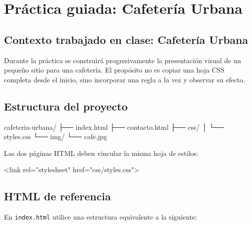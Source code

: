 \documentclass[11pt]{article}
\begin{document}
    \section{Práctica guiada: Cafetería Urbana}

    \subsection{Contexto trabajado en clase: Cafetería Urbana}

    Durante la práctica se construirá progresivamente la presentación visual de un pequeño sitio para una cafetería. El propósito no es copiar una hoja CSS completa desde el inicio, sino incorporar una regla a la vez y observar su efecto.

    \subsection{Estructura del proyecto}

    \begin{bashcodedark}
        cafeteria-urbana/
        ├── index.html
        ├── contacto.html
        ├── css/
        │   └── styles.css
        └── img/
            └── cafe.jpg
    \end{bashcodedark}

    Las dos páginas HTML deben vincular la misma hoja de estilos:

    \begin{htmlcodedark}
        <link rel="stylesheet" href="css/styles.css">
    \end{htmlcodedark}


    \subsection{HTML de referencia}

    En \texttt{index.html} utilice una estructura equivalente a la siguiente:
\end{document}
